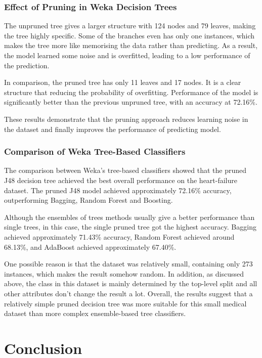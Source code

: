 \documentclass[12pt,a4paper]{article}
\begin{document}
\subsubsection{Effect of Pruning in Weka Decision Trees}

The unpruned tree gives a larger structure with 124 nodes and 79 leaves, making the tree highly specific. Some of the branches even has only one instances, which makes the tree more like memorising the data rather than predicting. As a result, the model learned some noise and is overfitted, leading to a low performance of the prediction.

In comparison, the pruned tree has only 11 leaves and 17 nodes. It is a clear structure that reducing the probability of overfitting. Performance of the model is significantly better than the previous unpruned tree, with an accuracy at 72.16\%.

These results demonstrate that the pruning approach reduces learning noise in the dataset and finally improves the performance of predicting model.

\subsubsection{Comparison of Weka Tree-Based Classifiers}

The comparison between Weka's tree-based classifiers showed that the pruned J48 decision tree achieved the best overall performance on the heart-failure dataset. The pruned J48 model achieved approximately 72.16\% accuracy, outperforming Bagging, Random Forest and Boosting.

Although the ensembles of trees methods usually give a better performance than single trees, in this case, the single pruned tree got the highest accuracy. Bagging achieved approximately 71.43\% accuracy, Random Forest achieved around 68.13\%, and AdaBoost achieved approximately 67.40\%.

One possible reason is that the dataset was relatively small, containing only 273 instances, which makes the result somehow random. In addition, as discussed above, the class in this dataset is mainly determined by the top-level split and all other attributes don't change the result a lot. Overall, the results suggest that a relatively simple pruned decision tree was more suitable for this small medical dataset than more complex ensemble-based tree classifiers.

\section{Conclusion}
\end{document}
